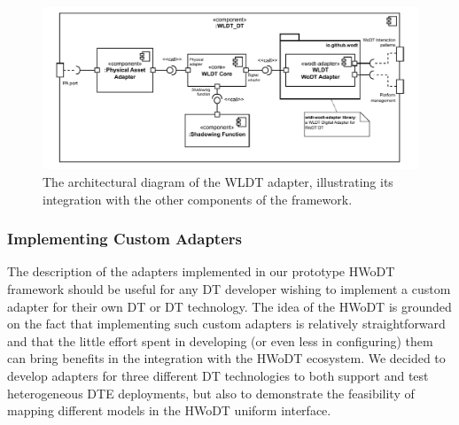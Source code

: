 \begin{figure}[t]
  \centering
  \includegraphics[width=\columnwidth]{figures/hwodt/wldt-adapter-c&c.pdf}
  \caption{The architectural diagram of the \ac{WLDT} adapter, illustrating its integration with the other components of the framework.}
  \label{fig:wldt-adapter-c&c}
\end{figure}



\subsubsection{Implementing Custom Adapters}
The description of the adapters implemented in our prototype \ac{HWoDT} framework should be useful for any \ac{DT} developer wishing to implement a custom adapter for their own \ac{DT} or \ac{DT} technology. 
%
The idea of the \ac{HWoDT} is grounded on the fact that implementing such custom adapters is relatively straightforward and that the little effort spent in developing (or even less in configuring) them can bring benefits in the integration with the \ac{HWoDT} ecosystem.
%
We decided to develop adapters for three different \ac{DT} technologies to both support and test heterogeneous \ac{DTE} deployments, but also to demonstrate the feasibility of mapping different models in the \ac{HWoDT} uniform interface.

